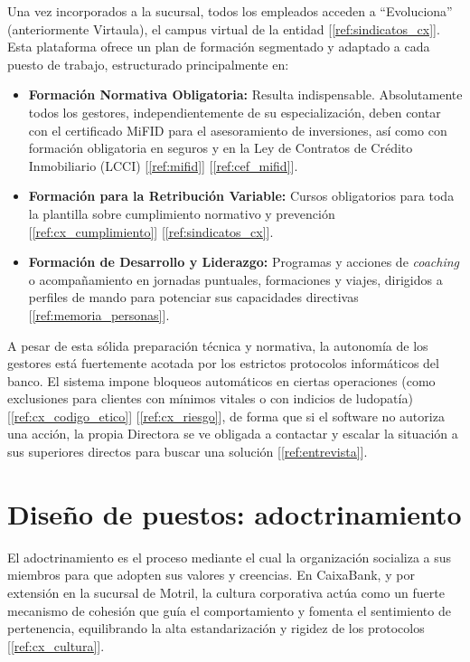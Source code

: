 Una vez incorporados a la sucursal, todos los empleados acceden a ``Evoluciona'' (anteriormente Virtaula), el campus virtual de la entidad [\ref{ref:sindicatos_cx}]. Esta plataforma ofrece un plan de formación segmentado y adaptado a cada puesto de trabajo, estructurado principalmente en:
\begin{itemize}
    \item \textbf{Formación Normativa Obligatoria:} Resulta indispensable. Absolutamente todos los gestores, independientemente de su especialización, deben contar con el certificado MiFID para el asesoramiento de inversiones, así como con formación obligatoria en seguros y en la Ley de Contratos de Crédito Inmobiliario (LCCI) [\ref{ref:mifid}] [\ref{ref:cef_mifid}].
    \item \textbf{Formación para la Retribución Variable:} Cursos obligatorios para toda la plantilla sobre cumplimiento normativo y prevención [\ref{ref:cx_cumplimiento}] [\ref{ref:sindicatos_cx}].
    \item \textbf{Formación de Desarrollo y Liderazgo:} Programas y acciones de \textit{coaching} o acompañamiento en jornadas puntuales, formaciones y viajes, dirigidos a perfiles de mando para potenciar sus capacidades directivas [\ref{ref:memoria_personas}].
\end{itemize}

A pesar de esta sólida preparación técnica y normativa, la autonomía de los gestores está fuertemente acotada por los estrictos protocolos informáticos del banco. El sistema impone bloqueos automáticos en ciertas operaciones (como exclusiones para clientes con mínimos vitales o con indicios de ludopatía) [\ref{ref:cx_codigo_etico}] [\ref{ref:cx_riesgo}], de forma que si el software no autoriza una acción, la propia Directora se ve obligada a contactar y escalar la situación a sus superiores directos para buscar una solución [\ref{ref:entrevista}].

\section{Diseño de puestos: adoctrinamiento}

%

El adoctrinamiento es el proceso mediante el cual la organización socializa a sus miembros para que adopten sus valores y creencias. En CaixaBank, y por extensión en la sucursal de Motril, la cultura corporativa actúa como un fuerte mecanismo de cohesión que guía el comportamiento y fomenta el sentimiento de pertenencia, equilibrando la alta estandarización y rigidez de los protocolos [\ref{ref:cx_cultura}].

